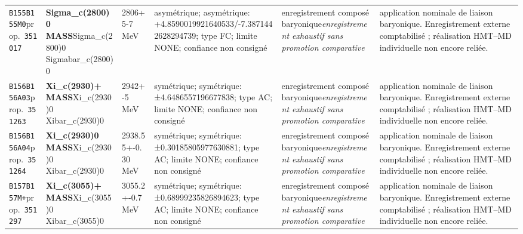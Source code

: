 \begin{landscape}
\begin{longtable}{L{1.85cm}L{4.45cm}L{2.35cm}L{4.05cm}L{3.35cm}L{7.15cm}}
\texttt{B155}\newline \texttt{B155M0}\newline prop.\ \texttt{351017} & \textbf{Sigma\_\allowbreak{}c(2800)0 MASS}\newline Sigma\_\allowbreak{}c(2800)0 \textbar{}\allowbreak{} Sigmabar\_\allowbreak{}c(2800)0 & 2806+5-7\,MeV & asymétrique; asymétrique: +4.8590019921640533/-7.3871442628294739; type FC; limite NONE; confiance non consigné & enregistrement composé baryonique\newline \emph{enregistrement exhaustif sans promotion comparative} & application nominale de liaison baryonique. Enregistrement externe comptabilisé ; réalisation HMT--MD individuelle non encore reliée. \\
\texttt{B156}\newline \texttt{B156A03}\newline prop.\ \texttt{351263} & \textbf{Xi\_\allowbreak{}c(2930)+ MASS}\newline Xi\_\allowbreak{}c(2930)0 \textbar{}\allowbreak{} Xibar\_\allowbreak{}c(2930)0 & 2942+-5\,MeV & symétrique; symétrique: ±4.6486557196677838; type AC; limite NONE; confiance non consigné & enregistrement composé baryonique\newline \emph{enregistrement exhaustif sans promotion comparative} & application nominale de liaison baryonique. Enregistrement externe comptabilisé ; réalisation HMT--MD individuelle non encore reliée. \\
\texttt{B156}\newline \texttt{B156A04}\newline prop.\ \texttt{351264} & \textbf{Xi\_\allowbreak{}c(2930)0 MASS}\newline Xi\_\allowbreak{}c(2930)0 \textbar{}\allowbreak{} Xibar\_\allowbreak{}c(2930)0 & 2938.55+-0.30\,MeV & symétrique; symétrique: ±0.30185805977630881; type AC; limite NONE; confiance non consigné & enregistrement composé baryonique\newline \emph{enregistrement exhaustif sans promotion comparative} & application nominale de liaison baryonique. Enregistrement externe comptabilisé ; réalisation HMT--MD individuelle non encore reliée. \\
\texttt{B157}\newline \texttt{B157M+}\newline prop.\ \texttt{351297} & \textbf{Xi\_\allowbreak{}c(3055)+ MASS}\newline Xi\_\allowbreak{}c(3055)0 \textbar{}\allowbreak{} Xibar\_\allowbreak{}c(3055)0 & 3055.2+-0.7\,MeV & symétrique; symétrique: ±0.68999235826894623; type AC; limite NONE; confiance non consigné & enregistrement composé baryonique\newline \emph{enregistrement exhaustif sans promotion comparative} & application nominale de liaison baryonique. Enregistrement externe comptabilisé ; réalisation HMT--MD individuelle non encore reliée. \\

\end{longtable}
\end{landscape}
